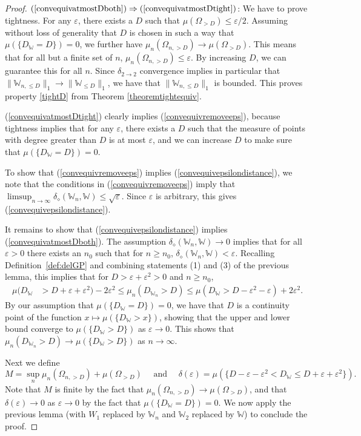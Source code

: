 \documentclass{amsart}
\numberwithin{equation}{section}
\numberwithin{figure}{section}
\theoremstyle{definition}
\theoremstyle{remark}
\newcommand{\eps}{\varepsilon}
\newcommand{\cW}{\mathbb{W}}
\newcommand{\deltt}{\delta_{2\to 2}}
\def\delGP{\delta_\diamond}
\begin{document}
\begin{proof}
$(\ref{convequivatmostDboth}) \Rightarrow (\ref{convequivatmostDtight})$: We
have to prove tightness. For any $\varepsilon$, there exists a $D$ such that
$\mu(\Omega_{>D}) \le \varepsilon/2$. Assuming without loss of generality
that $D$ is chosen in such a way that $\mu(\{D_{\cW}=D\})=0$, we further have
$\mu_{n}(\Omega_{n,>D}) \rightarrow \mu(\Omega_{> D})$. This means that for
all but a finite set of $n$, $\mu_{n}(\Omega_{n,>D}) \le \varepsilon$. By
increasing $D$, we can guarantee this for all $n$. Since $\deltt$ convergence
implies in particular that $\|\cW_{n,{\leq D}}\|_1 \rightarrow \|\cW_{\leq
D}\|_1$, we have that $\|\cW_{n,{\leq D}}\|_1$ is bounded. This proves
property \ref{tightD} from Theorem \ref{theoremtightequiv}.

(\ref{convequivatmostDtight}) clearly implies (\ref{convequivremoveeps}),
because tightness implies that for any $\varepsilon$, there exists a $D$ such
that the measure of points with degree greater than $D$ is at most
$\varepsilon$, and we can increase $D$ to make sure that
$\mu(\{D_\cW=D\})=0$.

To show that (\ref{convequivremoveeps}) implies
(\ref{convequivepsilondistance}), we note that the conditions in
(\ref{convequivremoveeps}) imply that
$\limsup_{n\to\infty}\delGP(\cW_n,\cW)\leq \sqrt\varepsilon$. Since
$\varepsilon$ is arbitrary, this gives (\ref{convequivepsilondistance}).

It remains to show that (\ref{convequivepsilondistance}) implies
(\ref{convequivatmostDboth}). The assumption $\delGP(\cW_n,\cW) \rightarrow
0$ implies that for all $\varepsilon>0$ there exists an $n_0$ such that for
$n\geq n_0$, $\delGP(\cW_n,\cW)< \varepsilon$. Recalling
Definition~\ref{def:delGP} and combining statements (1) and (3) of the
previous lemma, this implies that for $D>\varepsilon+\varepsilon^2>0$ and
$n\geq n_0$,
\begin{align*}
\mu(D_{\cW}&>D+\varepsilon+\varepsilon^2)-2\varepsilon^2
\leq
\mu_n(D_{\cW_n}>D)
\leq \mu(D_\cW>D-\varepsilon^2-\varepsilon)+2\varepsilon^2.
\end{align*}
By our assumption that $\mu(\{D_{\cW}=D\})=0$, we have that $D$ is a
continuity point of the function $x\mapsto\mu(\{D_\cW>x\})$, showing that the
upper and lower bound converge to $\mu(\{D_\cW>D\})$ as $\varepsilon\to 0$.
This shows that $\mu_n(D_{\cW_n}>D)\to \mu(\{D_\cW>D\})$ as $n\to\infty$.

Next we define
\[M=\sup_n\mu_n\left(\Omega_{n,>D}\right)+\mu(\Omega_{>D})
\quad\text{ and }\quad \delta(\eps)=\mu(\{D-\varepsilon-\eps^2<D_\cW\leq
D+\eps+\eps^2\}).\] Note that $M$ is finite by the fact that
$\mu_n(\Omega_{n,>D}) \rightarrow \mu(\Omega_{>D})$, and that
$\delta(\eps)\to 0$ as $\varepsilon\to 0$ by the fact that
$\mu(\{D_\cW=D\})=0$. We now apply the previous lemma (with $W_1$ replaced by
$\cW_n$ and $\cW_2$ replaced by $\cW$) to conclude the proof.
\end{proof}
\end{document}
